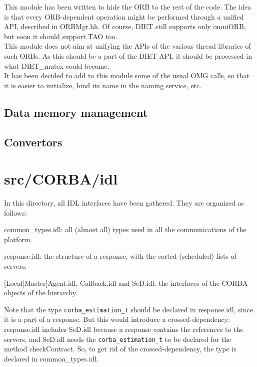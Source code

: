 This module has been written to hide the ORB to the rest of the code. The idea
is that every ORB-dependent operation might be performed through a unified API,
described in \textsf{ORBMgr.hh}. Of course, DIET still supports only omniORB,
but soon it should support TAO too.
\\
This module does not aim at unifying the APIs of the various thread libraries of
such ORBs. As this should be a part of the DIET API, it should be processed in
what \textsf{DIET\_mutex} could become.
\\
It has been decided to add to this module some of the usual OMG calls, so that
it is easier to initialize, bind its name in the naming service, etc.


\subsection{Data memory management}



\subsection{Convertors}




\section{\textsf{src/CORBA/idl}}
\label{s:IDL}

In this directory, all IDL interfaces have been gathered. They are organized as
follows:
\begin{description}
\item{\sf common\_types.idl}: all (almost all) types used in all the
  communications of the platform.
\item{\sf response.idl}: the structure of a response, with the sorted
  (scheduled) lists of servers.
\item{$[$\textsf{Local|Master}$]$\textsf{Agent.idl}, \textsf{Callback.idl} and
    \textsf{SeD.idl}}: the interfaces of the CORBA objects of the hierarchy.
\end{description}
Note that the type \texttt{corba\_estimation\_t} should be declared in
\textsf{response.idl}, since it is a part of a response. But this would
introduce a crossed-dependency: \textsf{response.idl} includes \textsf{SeD.idl}
because a response contains the references to the servers, and \textsf{SeD.idl}
needs the \texttt{corba\_estimation\_t} to be declared for the method
\textsf{checkContract}. So, to get rid of the crossed-dependency, the type is
declared in \textsf{common\_types.idl}.
\\

